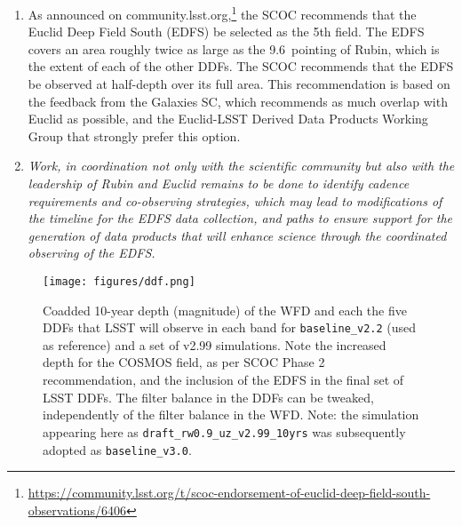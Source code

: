 \begin{enumerate}
\item As announced on community.lsst.org,\footnote{\url{https://community.lsst.org/t/scoc-endorsement-of-euclid-deep-field-south-observations/6406}} the SCOC recommends that the Euclid Deep Field South (EDFS) be selected as the 5th field. The EDFS covers an area roughly twice as large as the 9.6\degsq\ pointing of Rubin, which is the extent of each of the other DDFs. The SCOC recommends that the EDFS be observed at half-depth over its full area.
This recommendation is based on the feedback from the Galaxies SC, which recommends as much overlap with Euclid as possible, and the Euclid-LSST Derived Data Products Working Group \citep{https://doi.org/10.5281/zenodo.7195671} that strongly prefer this option. 

\item
 \emph{Work, in coordination not only with the scientific community but also with the leadership of Rubin and Euclid remains to be done to identify cadence requirements and co-observing strategies, which may lead to modifications of the timeline for the EDFS data collection, and paths to ensure support for the generation of data products that will enhance science through the coordinated observing of the EDFS.}


\end{enumerate}

\begin{figure}
    \centering
    \texttt{[image: figures/ddf.png]}
    \caption{Coadded 10-year depth (magnitude) of the WFD and each the five DDFs that LSST will observe in each band for \texttt{baseline\_v2.2} (used as reference) and a set of v2.99 simulations. Note the increased depth for the COSMOS field, as per SCOC Phase 2 recommendation, and the inclusion of the EDFS in the final set of LSST DDFs. The filter balance in the DDFs can be tweaked, independently of the filter balance in the WFD. Note: the simulation appearing here as \texttt{draft\_rw0.9\_uz\_v2.99\_10yrs} was subsequently adopted as \texttt{baseline\_v3.0}.}
    \label{fig:my_label}
\end{figure}
